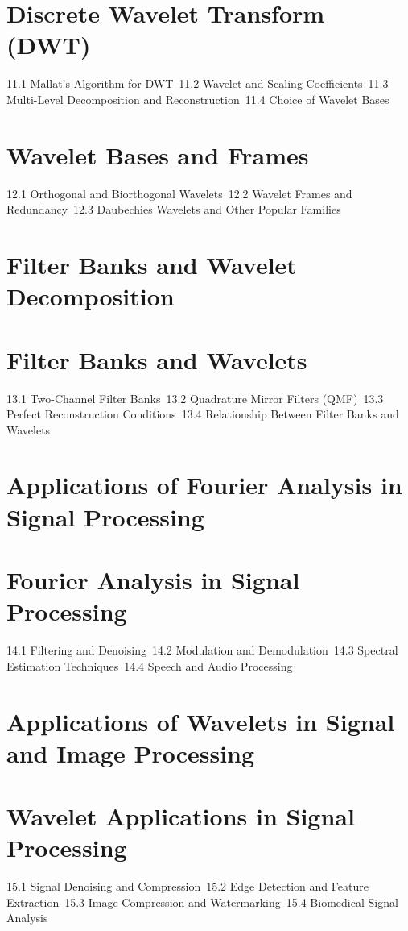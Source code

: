 \section{Discrete Wavelet Transform (DWT)}
11.1 Mallat's Algorithm for DWT\
11.2 Wavelet and Scaling Coefficients\
11.3 Multi-Level Decomposition and Reconstruction\
11.4 Choice of Wavelet Bases\
\section{Wavelet Bases and Frames}
12.1 Orthogonal and Biorthogonal Wavelets\
12.2 Wavelet Frames and Redundancy\
12.3 Daubechies Wavelets and Other Popular Families\
\section{Filter Banks and Wavelet Decomposition}
\section{Filter Banks and Wavelets}
13.1 Two-Channel Filter Banks\
13.2 Quadrature Mirror Filters (QMF)\
13.3 Perfect Reconstruction Conditions\
13.4 Relationship Between Filter Banks and Wavelets\
\section{Applications of Fourier Analysis in Signal Processing}
\section{Fourier Analysis in Signal Processing}
14.1 Filtering and Denoising\
14.2 Modulation and Demodulation\
14.3 Spectral Estimation Techniques\
14.4 Speech and Audio Processing\
\section{Applications of Wavelets in Signal and Image Processing}
\section{Wavelet Applications in Signal Processing}
15.1 Signal Denoising and Compression\
15.2 Edge Detection and Feature Extraction\
15.3 Image Compression and Watermarking\
15.4 Biomedical Signal Analysis\
